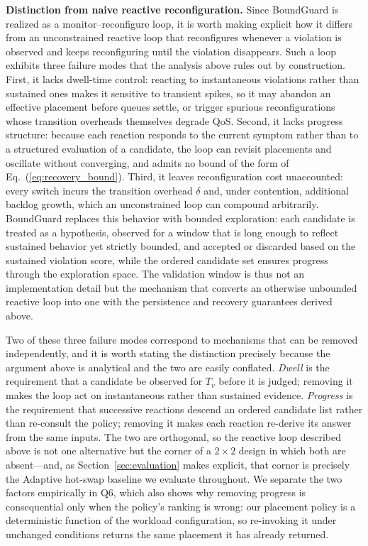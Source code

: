 \documentclass[conference]{IEEEtran}
\begin{document}
\noindent\textbf{Distinction from naive reactive reconfiguration.}
Since BoundGuard is realized as a monitor--reconfigure loop, it is worth making explicit how it differs from an unconstrained reactive loop that reconfigures whenever a violation is observed and keeps reconfiguring until the violation disappears. Such a loop exhibits three failure modes that the analysis above rules out by construction. First, it lacks dwell-time control: reacting to instantaneous violations rather than sustained ones makes it sensitive to transient spikes, so it may abandon an effective placement before queues settle, or trigger spurious reconfigurations whose transition overheads themselves degrade QoS. Second, it lacks progress structure: because each reaction responds to the current symptom rather than to a structured evaluation of a candidate, the loop can revisit placements and oscillate without converging, and admits no bound of the form of Eq.~(\ref{eq:recovery_bound}). Third, it leaves reconfiguration cost unaccounted: every switch incurs the transition overhead $\delta$ and, under contention, additional backlog growth, which an unconstrained loop can compound arbitrarily. BoundGuard replaces this behavior with bounded exploration: each candidate is treated as a hypothesis, observed for a window that is long enough to reflect sustained behavior yet strictly bounded, and accepted or discarded based on the sustained violation score, while the ordered candidate set ensures progress through the exploration space. The validation window is thus not an implementation detail but the mechanism that converts an otherwise unbounded reactive loop into one with the persistence and recovery guarantees derived above.

\textcolor{navyblue}{Two of these three failure modes correspond to mechanisms that can be removed independently, and it is worth stating the distinction precisely because the argument above is analytical and the two are easily conflated. \emph{Dwell} is the requirement that a candidate be observed for $T_v$ before it is judged; removing it makes the loop act on instantaneous rather than sustained evidence. \emph{Progress} is the requirement that successive reactions descend an ordered candidate list rather than re-consult the policy; removing it makes each reaction re-derive its answer from the same inputs. The two are orthogonal, so the reactive loop described above is not one alternative but the corner of a $2\times2$ design in which both are absent---and, as Section~\ref{sec:evaluation} makes explicit, that corner is precisely the Adaptive hot-swap baseline we evaluate throughout. We separate the two factors empirically in Q6, which also shows why removing progress is consequential only when the policy's ranking is wrong: our placement policy is a deterministic function of the workload configuration, so re-invoking it under unchanged conditions returns the same placement it has already returned.}
\end{document}
